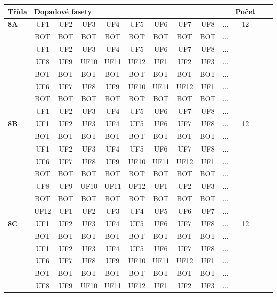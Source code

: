 \begin{table}[h!]
\centering
\begin{tabular}{|l|c|c|c|c|c|c|c|c|c|c|c|c|}
\hline
Třída &  \multicolumn{9}{l}{Dopadové fasety} \vline  & Počet\\
\hline \hline
\textbf{8A} & UF1 & UF2 & UF3 & UF4 & UF5 & UF6 & UF7 & UF8 & $\dots$ & 12\\
 & BOT & BOT & BOT & BOT & BOT & BOT & BOT & BOT & $\dots$ & \\
 & UF1 & UF2 & UF3 & UF4 & UF5 & UF6 & UF7 & UF8 & $\dots$ & \\
 & UF8 & UF9 & UF10 & UF11 & UF12 & UF1 & UF2 & UF3 & $\dots$ & \\
 & BOT & BOT & BOT & BOT & BOT & BOT & BOT & BOT & $\dots$ & \\
 & UF6 & UF7 & UF8 & UF9 & UF10 & UF11 & UF12 & UF1 & $\dots$ & \\
 & BOT & BOT & BOT & BOT & BOT & BOT & BOT & BOT & $\dots$ & \\
 & UF1 & UF2 & UF3 & UF4 & UF5 & UF6 & UF7 & UF8 & $\dots$ & \\
\hline \hline
\textbf{8B} & UF1 & UF2 & UF3 & UF4 & UF5 & UF6 & UF7 & UF8 & $\dots$ & 12\\
 & BOT & BOT & BOT & BOT & BOT & BOT & BOT & BOT & $\dots$ & \\
 & UF1 & UF2 & UF3 & UF4 & UF5 & UF6 & UF7 & UF8 & $\dots$ & \\
 & UF6 & UF7 & UF8 & UF9 & UF10 & UF11 & UF12 & UF1 & $\dots$ & \\
 & BOT & BOT & BOT & BOT & BOT & BOT & BOT & BOT & $\dots$ & \\
 & UF8 & UF9 & UF10 & UF11 & UF12 & UF1 & UF2 & UF3 & $\dots$ & \\
 & BOT & BOT & BOT & BOT & BOT & BOT & BOT & BOT & $\dots$ & \\
 & UF12 & UF1 & UF2 & UF3 & UF4 & UF5 & UF6 & UF7 & $\dots$ & \\
\hline \hline
\textbf{8C} & UF1 & UF2 & UF3 & UF4 & UF5 & UF6 & UF7 & UF8 & $\dots$ & 12\\
 & BOT & BOT & BOT & BOT & BOT & BOT & BOT & BOT & $\dots$ & \\
 & UF1 & UF2 & UF3 & UF4 & UF5 & UF6 & UF7 & UF8 & $\dots$ & \\
 & UF6 & UF7 & UF8 & UF9 & UF10 & UF11 & UF12 & UF1 & $\dots$ & \\
 & BOT & BOT & BOT & BOT & BOT & BOT & BOT & BOT & $\dots$ & \\
 & UF8 & UF9 & UF10 & UF11 & UF12 & UF1 & UF2 & UF3 & $\dots$ & \\

\end{tabular}
\end{table}
